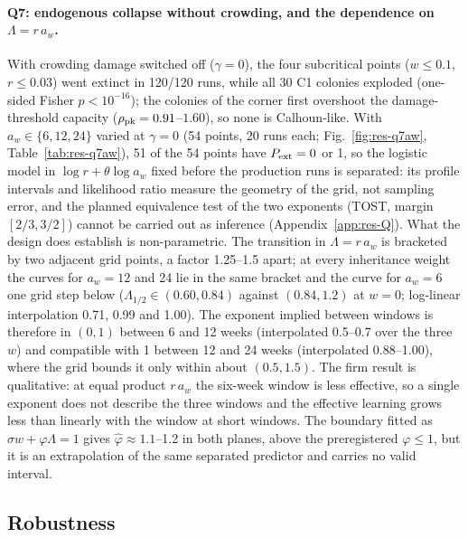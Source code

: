 \paragraph{Q7: endogenous collapse without crowding, and the dependence on $\Lambda=r\,a_w$.}
With crowding damage switched off ($\gamma=0$), the four subcritical points ($w\le0.1$, $r\le0.03$) went extinct in
120/120 runs, while all 30 \textsf{C1} colonies exploded (one-sided Fisher $p<10^{-16}$); the colonies of the corner
first overshoot the damage-threshold capacity ($\rho_{\rm pk}=0.91$--$1.60$), so none is Calhoun-like. With
$a_w\in\{6,12,24\}$ varied at $\gamma=0$ (54 points, 20 runs each; Fig.~\ref{fig:res-q7aw},
Table~\ref{tab:res-q7aw}), 51 of the 54 points have $P_{\rm ext}=0$ or 1, so the logistic model in
$\log r+\theta\log a_w$ fixed before the production runs is separated: its profile intervals and likelihood ratio measure the
geometry of the grid, not sampling error, and the planned equivalence test of the two exponents (TOST, margin
$[2/3,3/2]$) cannot be carried out as inference (Appendix~\ref{app:res-Q}). What the design does establish is
non-parametric. The transition in $\Lambda=r\,a_w$ is bracketed by two adjacent grid points, a factor 1.25--1.5
apart; at every inheritance weight the curves for $a_w=12$ and 24 lie in the same bracket and the curve for $a_w=6$
one grid step below ($\Lambda_{1/2}\in(0.60,0.84)$ against $(0.84,1.2)$ at $w=0$; log-linear interpolation 0.71,
0.99 and 1.00). The exponent implied between windows is therefore in $(0,1)$ between 6 and 12 weeks (interpolated
0.5--0.7 over the three $w$) and compatible with 1 between 12 and 24 weeks (interpolated 0.88--1.00), where the grid
bounds it only within about $(0.5,1.5)$. The firm result is qualitative: at equal product $r\,a_w$ the six-week
window is less effective, so a single exponent does not describe the three windows and the effective learning grows
less than linearly with the window at short windows. The boundary fitted as $\sigma w+\varphi\Lambda=1$ gives
$\hat\varphi\approx1.1$--1.2 in both planes, above the preregistered $\varphi\le1$, but it is an extrapolation of the
same separated predictor and carries no valid interval.

\subsection{Robustness}
\label{sec:res-robustness}

